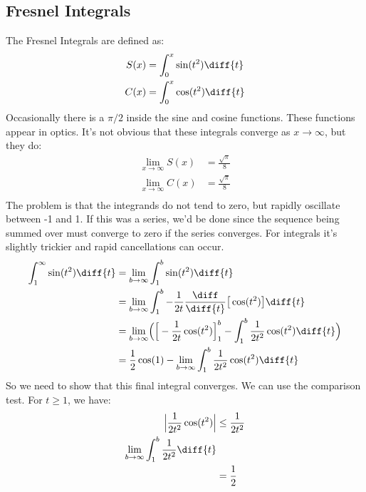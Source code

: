 \documentclass[crop=false,class=book,oneside]{standalone}
\begin{document}
        \subsection{Fresnel Integrals}
            The Fresnel Integrals are defined as:
            \begin{align}
                S(x)&=\int_{0}^{x}\sin(t^{2})\diff{t}\\
                C(x)&=\int_{0}^{x}\cos(t^{2})\diff{t}
            \end{align}
            Occasionally there is a $\pi/2$ inside the sine and
            cosine functions. These functions appear in optics.
            It's not obvious that these integrals converge as
            $x\rightarrow\infty$, but they do:
            \begin{align}
                \underset{x\rightarrow\infty}{\lim}S(x)
                &=\frac{\sqrt{\pi}}{8}\\
                \underset{x\rightarrow\infty}{\lim}C(x)
                &=\frac{\sqrt{\pi}}{8}\\
            \end{align}
            The problem is that the integrands do not tend to
            zero, but rapidly oscillate between -1 and 1. If this
            was a series, we'd be done since the sequence being
            summed over must converge to zero if the series
            converges. For integrals it's slightly trickier and
            rapid cancellations can occur.
            \begin{align}
                \int_{1}^{\infty}\sin(t^{2})\diff{t}
                &=\underset{b\rightarrow\infty}{\lim}
                \int_{1}^{b}\sin(t^{2})\diff{t}\\
                &=\underset{b\rightarrow\infty}{\lim}
                \int_{1}^{b}-\frac{1}{2t}\frac{\diff}{\diff{t}}
                \big[\cos(t^{2})\big]\diff{t}\\
                &=\underset{b\rightarrow\infty}{\lim}
                \Big(\Big[-\frac{1}{2t}\cos(t^{2})\Big]_{1}^{b}
                -\int_{1}^{b}\frac{1}{2t^{2}}\cos(t^{2})\diff{t}
                \Big)\\
                &=\frac{1}{2}\cos(1)-
                \underset{b\rightarrow\infty}{\lim}
                \int_{1}^{b}\frac{1}{2t^{2}}\cos(t^{2})\diff{t}
            \end{align}
            So we need to show that this final integral converges.
            We can use the comparison test. For $t\geq{1}$, we have:
            \begin{align}
                \Big|\frac{1}{2t^{2}}\cos(t^{2})\Big|&\leq
                \frac{1}{2t^{2}}\\
                \underset{b\rightarrow\infty}{\lim}
                \int_{1}^{b}\frac{1}{2t^{2}}\diff{t}\\
                &=\frac{1}{2}
            \end{align}
\end{document}
